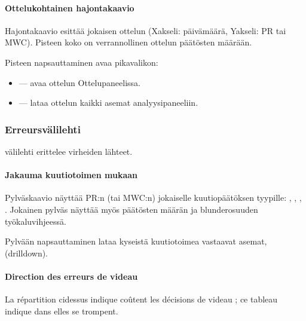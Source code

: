 \documentclass[letterpaper,10pt,finnish]{sphinxmanual}
\begin{document}
\paragraph{Ottelukohtainen hajontakaavio}
\label{\detokenize{manuel:scatter-plot-par-match}}
\sphinxAtStartPar
Hajontakaavio esittää jokaisen ottelun (X\sphinxhyphen{}akseli: päivämäärä, Y\sphinxhyphen{}akseli: PR tai MWC). Pisteen koko on verrannollinen ottelun päätösten määrään.

\sphinxAtStartPar
Pisteen napsauttaminen avaa pikavalikon:
\begin{itemize}
\item {} 
\sphinxAtStartPar
{} — avaa ottelun Ottelupaneelissa.

\item {} 
\sphinxAtStartPar
{} — lataa ottelun kaikki asemat analyysipaneeliin.

\end{itemize}


\subsubsection{Erreurs\sphinxhyphen{}välilehti}
\label{\detokenize{manuel:onglet-erreurs}}
\sphinxAtStartPar
{}\sphinxhyphen{}välilehti erittelee virheiden lähteet.


\paragraph{Jakauma kuutiotoimen mukaan}
\label{\detokenize{manuel:repartition-par-action-de-videau}}
\sphinxAtStartPar
Pylväskaavio näyttää PR:n (tai MWC:n) jokaiselle kuutiopäätöksen tyypille: , , , . Jokainen pylväs näyttää myös päätösten määrän ja blunder\sphinxhyphen{}osuuden työkaluvihjeessä.

\sphinxAtStartPar
Pylvään napsauttaminen lataa kyseistä kuutiotoimea vastaavat asemat,  (drill\sphinxhyphen{}down).


\paragraph{Direction des erreurs de videau}
\label{\detokenize{manuel:direction-des-erreurs-de-videau}}
\sphinxAtStartPar
La répartition ci\sphinxhyphen{}dessus indique  coûtent les décisions de videau ;
ce tableau indique dans  elles se trompent.
\end{document}
